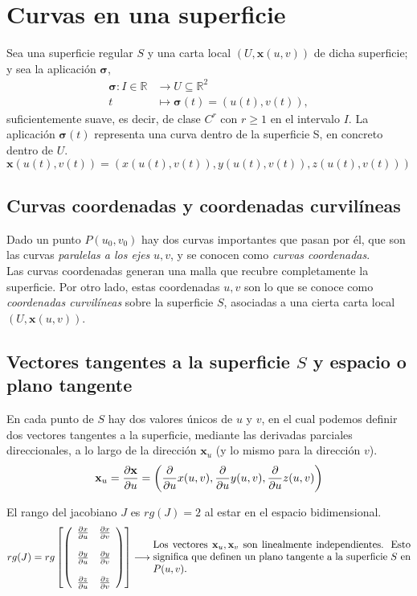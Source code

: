 \section{Curvas en una superficie}

Sea una superficie regular $S$ y una carta local $(U,\mathbf{x}(u,v))$ de dicha superficie; y sea la aplicación $\mathbf{\sigma}$,
\begin{align*}
    \mathbf{\sigma}:I\in \mathbb{R}&\longrightarrow U\subseteq \mathbb{R}^2\\
    t&\longmapsto \mathbf{\sigma}(t)=(u(t),v(t)),
\end{align*}
suficientemente suave, es decir, de clase $C^r$ con $r\ge 1$ en el intervalo $I$. La aplicación $\mathbf{\sigma}(t)$ representa una curva dentro de la superficie S, en concreto dentro de $U$. 
$$
\mathbf{x}(u(t),v(t))=(x(u(t),v(t)),y(u(t),v(t)),z(u(t),v(t)))
$$
\subsection{Curvas coordenadas y coordenadas curvilíneas}
Dado un punto $P(u_0,v_0)$ hay dos curvas importantes que pasan por él, que son las curvas \emph{paralelas a los ejes} $u,v$, y se conocen como \emph{curvas coordenadas}.\\


Las curvas coordenadas generan una malla que recubre completamente la superficie. Por otro lado, estas coordenadas $u,v$ son lo que se conoce como \emph{coordenadas curvilíneas} sobre la superficie $S$, asociadas a una cierta carta local $(U,\mathbf{x}(u,v))$.

\subsection{Vectores tangentes a la superficie $S$ y espacio o plano tangente}
En cada punto de $S$ hay dos valores únicos de $u$ y $v$, en el cual podemos definir dos vectores tangentes a la superficie, mediante las derivadas parciales direccionales, a lo largo de la dirección $\mathbf{x}_u$ (y lo mismo para la dirección $v$).
$$
\mathbf{x}_u=\pdv{\mathbf{x}}{u}=\left ( \pdv{}{u}x(u,v),\pdv{}{u}y(u,v), \pdv{}{u}z(u,v)\right )
$$

El rango del jacobiano $J$ es $rg(J)=2$ al estar en el espacio bidimensional.
$$
rg(J)=rg\left [ \left ( 
\begin{array}{cc}
     \pdv{x}{u}&\pdv{x}{v}  \\\\
     \pdv{y}{u}&\pdv{y}{v}  \\\\
     \pdv{z}{u}&\pdv{z}{v}
\end{array}
\right )\right ] \longrightarrow \text{\parbox{9cm}{Los vectores $\mathbf{x}_u, \mathbf{x}_v$ son linealmente independientes. Esto significa que definen un plano tangente a la superficie $S$ en $P(u,v)$.}}
$$

